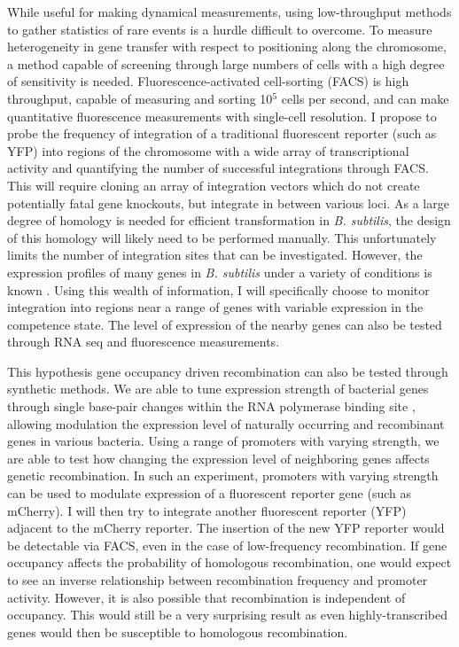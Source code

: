 While useful for making dynamical measurements, using low-throughput methods to
gather statistics of rare events is a hurdle difficult to overcome. To measure
heterogeneity in gene transfer with respect to positioning along the chromosome,
a method capable of screening through large numbers of cells with a high degree
of sensitivity is needed. Fluorescence-activated cell-sorting (FACS) is high
throughput, capable of measuring and sorting 10$^5$ cells per second, and can
make quantitative fluorescence measurements with single-cell resolution.  I
propose to probe the frequency of integration of a traditional fluorescent
reporter (such as YFP) into regions of the chromosome with a wide array of
transcriptional activity and quantifying the number of successful integrations
through FACS. This will require cloning an array of integration vectors which do
not create potentially fatal gene knockouts, but integrate in between various
loci. As a large degree of homology is needed for efficient transformation in
\textit{B. subtilis}, the design of this homology will likely need to be
performed manually. This unfortunately limits the number of integration sites
that can be investigated. However, the expression profiles of many genes in
\textit{B. subtilis} under a variety of conditions is known
\cite{Buescher:2012ih, Michna:2013jj, Salvetti:2011bs, Carpentier:2005ip}. Using
this wealth of information, I will specifically choose to monitor integration
into regions near a range of genes with variable expression in the competence
state. The level of expression of the nearby genes can also be tested through
RNA seq and fluorescence measurements.

This hypothesis gene occupancy driven recombination can also be tested through
synthetic methods. We are able to tune expression strength of bacterial
genes through single base-pair changes within the RNA polymerase binding site
\cite{Brewster:2012jw}, allowing modulation the expression level of
naturally occurring and recombinant genes in various bacteria. Using a range of
promoters with varying strength, we are able to test how changing the expression
level of neighboring genes affects genetic recombination. In such an experiment,
promoters with varying strength can be used to modulate expression of a
fluorescent reporter gene (such as mCherry). I will then try to integrate
another fluorescent reporter (YFP) adjacent to the mCherry reporter. The
insertion of the new YFP reporter would be detectable via FACS, even in the case
of low-frequency recombination. If gene occupancy affects the probability of
homologous recombination, one would expect to see an inverse relationship
between recombination frequency and promoter activity. However, it is also
possible that recombination is independent of occupancy. This would still be a
very surprising result as even highly-transcribed genes would then be
susceptible to homologous recombination. 




